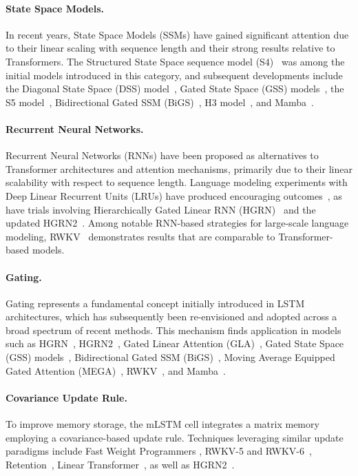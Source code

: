 \paragraph{State Space Models.} In recent years, State Space Models (SSMs) have gained significant attention due to their linear scaling with sequence length and their strong results relative to Transformers. The Structured State Space sequence model (S4)~\citep{Gu:21} was among the initial models introduced in this category, and subsequent developments include the Diagonal State Space (DSS) model~\citep{Gupta:22}, Gated State Space (GSS) models~\citep{Mehta:22}, the S5 model~\citep{Smith:22}, Bidirectional Gated SSM (BiGS)~\citep{Wang:22}, H3 model~\citep{Fu:23}, and Mamba~\citep{Gu:24arxiv}.

\paragraph{Recurrent Neural Networks.} Recurrent Neural Networks (RNNs) have been proposed as alternatives to Transformer architectures and attention mechanisms, primarily due to their linear scalability with respect to sequence length. Language modeling experiments with Deep Linear Recurrent Units (LRUs) have produced encouraging outcomes~\citep{Orvieto:23, De:24arxiv}, as have trials involving Hierarchically Gated Linear RNN (HGRN)~\citep{Qin:23} and the updated HGRN2~\citep{Qin:24arxiv}. Among notable RNN-based strategies for large-scale language modeling, RWKV~\citep{Peng:23arxivshort,Peng:24arxivshort} demonstrates results that are comparable to Transformer-based models.

\paragraph{Gating.}
Gating represents a fundamental concept initially introduced in LSTM architectures, which has subsequently been re-envisioned and adopted across a broad spectrum of recent methods. This mechanism finds application in models such as HGRN~\citep{Qin:23}, HGRN2~\citep{Qin:24arxiv}, Gated Linear Attention (GLA)~\citep{Yang:23arxiv}, Gated State Space (GSS) models~\citep{Mehta:22}, Bidirectional Gated SSM (BiGS)~\citep{Wang:22}, Moving Average Equipped Gated Attention (MEGA)~\citep{Ma:22}, RWKV~\citep{Peng:23arxivshort}, and Mamba~\citep{Gu:24arxiv}.

\paragraph{Covariance Update Rule.} 
To improve memory storage, the mLSTM cell integrates a matrix memory employing a covariance-based update rule. Techniques leveraging similar update paradigms include Fast Weight Programmers \citep{Schmidhuber:92ncfastweights,Schlag:21}, RWKV-5 and RWKV-6~\citep{Peng:24arxivshort}, Retention~\citep{Sun:23arxiv}, Linear Transformer~\citep{Katharopoulos:20}, as well as HGRN2~\citep{Qin:24arxiv}.

